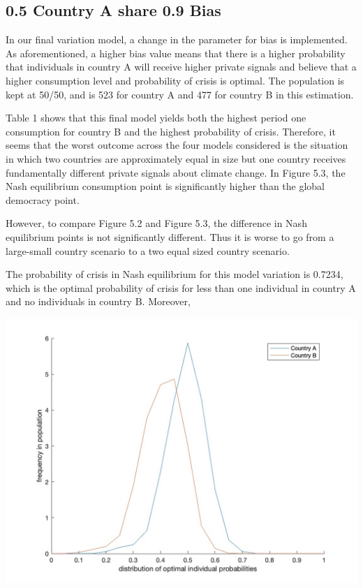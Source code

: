 \documentclass[11pt,preprint, authoryear]{elsarticle}
\let\origfigure\figure
\let\endorigfigure\endfigure
\renewenvironment{figure}[1][2] {
    \expandafter\origfigure\expandafter[H]
} {
    \endorigfigure
}
\numberwithin{equation}{section}
\numberwithin{figure}{section}
\numberwithin{table}{section}
\begin{document}
\hypertarget{country-a-share-0.9-bias}{%
\subsection*{0.5 Country A share 0.9
Bias}\label{country-a-share-0.9-bias}}

In our final variation model, a change in the parameter for bias is
implemented. As aforementioned, a higher bias value means that there is
a higher probability that individuals in country A will receive higher
private signals and believe that a higher consumption level and
probability of crisis is optimal. The population is kept at 50/50, and
is 523 for country A and 477 for country B in this estimation.

Table 1 shows that this final model yields both the highest period one
consumption for country B and the highest probability of crisis.
Therefore, it seems that the worst outcome across the four models
considered is the situation in which two countries are approximately
equal in size but one country receives fundamentally different private
signals about climate change. In Figure 5.3, the Nash equilibrium
consumption point is significantly higher than the global democracy
point.

However, to compare Figure 5.2 and Figure 5.3, the difference in Nash
equilibrium points is not significantly different. Thus it is worse to
go from a large-small country scenario to a two equal sized country
scenario.

The probability of crisis in Nash equilibrium for this model variation
is 0.7234, which is the optimal probability of crisis for less than one
individual in country A and no individuals in country B. Moreover,

\begin{figure}[H]

{\centering \includegraphics[width=0.8\linewidth]{images/Fig4_0.5Size0.9Bias} 

}

\caption{0.9 Country A bias model: Kernel density function of the distribution of the optimal probabilty of crisis and frequency thereof across individuals in country A and country B}\label{fig:unnamed-chunk-7}
\end{figure}
\end{document}
